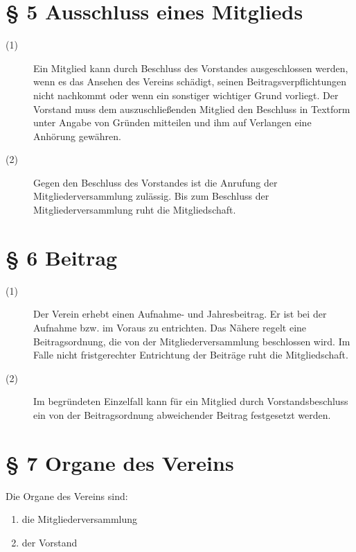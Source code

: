\documentclass[12pt,paper=a4,ngerman]{scrreprt}
\begin{document}
\section{\S{} 5 Ausschluss eines Mitglieds}
\begin{description}
	\item[(1)] Ein Mitglied kann durch Beschluss des Vorstandes ausgeschlossen werden, wenn es das Ansehen des Vereins schädigt, seinen Beitragsverpflichtungen nicht nachkommt oder wenn ein sonstiger wichtiger Grund vorliegt. Der Vorstand muss dem auszuschließenden Mitglied den Beschluss in Textform unter Angabe von Gründen mitteilen und ihm auf Verlangen eine Anhörung gewähren.
	\item[(2)] Gegen den Beschluss des Vorstandes ist die Anrufung der Mitgliederversammlung zulässig. Bis zum Beschluss der Mitgliederversammlung ruht die Mitgliedschaft.
\end{description}
\section{\S{} 6 Beitrag}
\begin{description}
	\item[(1)] Der Verein erhebt einen Aufnahme- und Jahresbeitrag. Er ist bei der Aufnahme bzw. im Voraus zu entrichten. Das Nähere regelt eine Beitragsordnung, die von der Mitgliederversammlung beschlossen wird. Im Falle nicht fristgerechter Entrichtung der Beiträge ruht die Mitgliedschaft.
	\item[(2)] Im begründeten Einzelfall kann für ein Mitglied durch Vorstandsbeschluss ein von der Beitragsordnung abweichender Beitrag festgesetzt werden.
\end{description}
\section{\S{} 7 Organe des Vereins}
Die Organe des Vereins sind:
\begin{enumerate}
	\item die Mitgliederversammlung
	\item der Vorstand
\end{enumerate}
\end{document}
